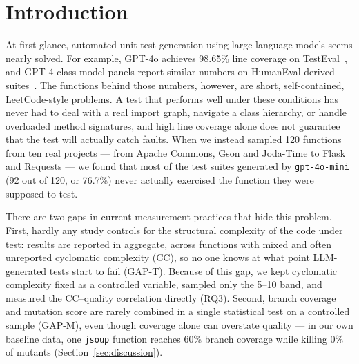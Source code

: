\section{Introduction}\label{sec:intro}

At first glance, automated unit test generation using large language models seems nearly
solved. For example, GPT-4o achieves 98.65\% line coverage on
TestEval~\cite{wang2025testeval}, and GPT-4-class model panels report similar numbers on
HumanEval-derived suites~\cite{kumar2025empirical}. The functions behind those numbers,
however, are short, self-contained, LeetCode-style problems. A test that performs well
under these conditions has never had to deal with a real import graph, navigate a class
hierarchy, or handle overloaded method signatures, and high line coverage alone does not
guarantee that the test will actually catch faults. When we instead sampled 120 functions
from ten real projects --- from Apache Commons, Gson and Joda-Time to Flask and Requests
--- we found that most of the test suites generated by \texttt{gpt-4o-mini} (92 out of
120, or 76.7\%) never actually exercised the function they were supposed to test.

There are two gaps in current measurement practices that hide this problem. First, hardly
any study controls for the structural complexity of the code under test: results are
reported in aggregate, across functions with mixed and often unreported cyclomatic
complexity (CC), so no one knows at what point LLM-generated tests start to fail (GAP-T).
Because of this gap, we kept cyclomatic complexity fixed as a controlled variable, sampled
only the 5--10 band, and measured the CC--quality correlation directly (RQ3). Second,
branch coverage and mutation score are rarely combined in a single statistical test on a
controlled sample (GAP-M), even though coverage alone can overstate quality --- in our own
baseline data, one \texttt{jsoup} function reaches 60\% branch coverage while killing 0\%
of mutants (Section~\ref{sec:discussion}).

